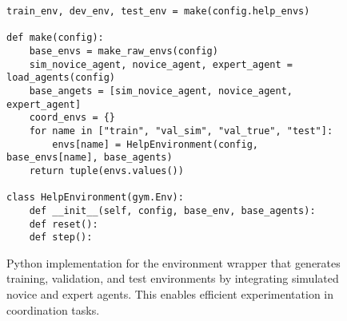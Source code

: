 \begin{figure*}[t]
\centering
\begin{tcolorbox}[title={\begin{pseudo}Environment Wrapper\end{pseudo}}, colback=sbBlue025, colframe=sbBlue]
\begin{verbatim}
train_env, dev_env, test_env = make(config.help_envs) 

def make(config):
    base_envs = make_raw_envs(config)
    sim_novice_agent, novice_agent, expert_agent = load_agents(config)
    base_angets = [sim_novice_agent, novice_agent, expert_agent]
    coord_envs = {}
    for name in ["train", "val_sim", "val_true", "test"]:
        envs[name] = HelpEnvironment(config, base_envs[name], base_agents)
    return tuple(envs.values())

class HelpEnvironment(gym.Env):
    def __init__(self, config, base_env, base_agents):
    def reset(): 
    def step():
\end{verbatim}
\end{tcolorbox}
\caption{Python implementation for the environment wrapper that generates training, validation, and test environments by integrating simulated novice and expert agents. This enables efficient experimentation in coordination tasks.}
\label{fig:env_wrapper}
\end{figure*}
